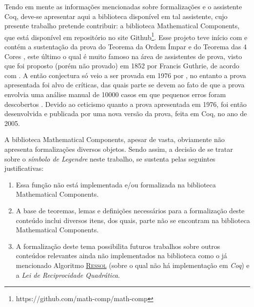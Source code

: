 Tendo em mente as informações mencionadas sobre formalizações e o assistente Coq, deve-se apresentar aqui a biblioteca disponível em tal assistente, cujo presente trabalho pretende contribuir: a biblioteca Mathematical Components, que está disponível em repositório no site Github\footnote{https://github.com/math-comp/math-comp}. Esse projeto teve início com e contém a sustentação da prova do Teorema da Ordem Ímpar e do Teorema das 4 Cores \cite{assia_mahboubi_2022_7118596}, este último o qual é muito famoso na área de assistentes de prova, visto que foi proposto (porém não provado) em 1852 por Francis Guthrie, de acordo com \cite{gonthier:hal-04034866}. A então conjectura só veio a ser provada em 1976 por \cite{bams/1183538218}, no entanto a prova apresentada foi alvo de críticas, das quais parte se devem ao fato de que a prova envolvia uma análise manual de 10000 casos em que pequenos erros foram descobertos \cite{gonthier:hal-04034866}. Devido ao ceticismo quanto a prova apresentada em 1976, foi então desenvolvida e publicada por \cite{gonthier:hal-04034866} uma nova versão da prova, feita em Coq, no ano de 2005.

A biblioteca Mathematical Components, apesar de vasta, obviamente não apresenta formalizações diversos objetos. Sendo assim, a decisão de se tratar sobre o \textit{símbolo de Legendre} neste trabalho, se sustenta pelas seguintes justificativas:
\begin{enumerate}
    \item Essa função não está implementada e/ou formalizada na biblioteca Mathematical Components.
    \item A base de teoremas, lemas e definições necessários para a formalização deste conteúdo inclui diversos itens, dos quais, parte não se encontram na biblioteca Mathematical Components.
    \item A formalização deste tema possibilita futuros trabalhos sobre outros conteúdos relevantes ainda não implementados na biblioteca como o já mencionado Algoritmo \hyperref[algo:ressol]{\textsc{Ressol}} (sobre o qual não há implementação em \textit{Coq}) e a \textit{Lei de Reciprocidade Quadrática}. 
    
\end{enumerate}

